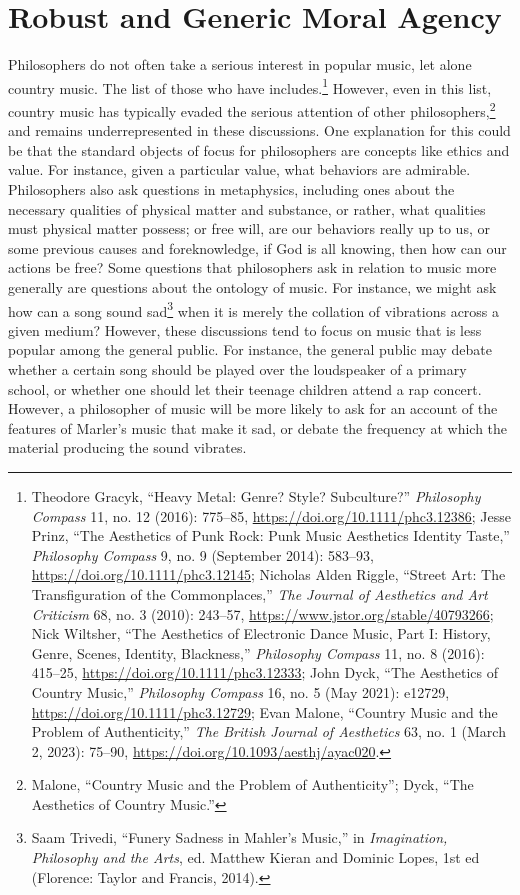 \documentclass[phdthesis,12pt,final,a4paper]{wuthesis}
\theoremstyle{definition}
\theoremstyle{definition}
\theoremstyle{definition}
\theoremstyle{definition}
\theoremstyle{remark}
\begin{document}
\chapter{Robust and Generic Moral Agency}\label{robust-and-generic-moral-agency}

Philosophers do not often take a serious interest in popular music, let alone country music. The list of those who have includes.\footnote{Theodore Gracyk, {``Heavy Metal: Genre? {Style}? {Subculture}?''} \emph{Philosophy Compass} 11, no. 12 (2016): 775--85, \url{https://doi.org/10.1111/phc3.12386}; Jesse Prinz, {``The {Aesthetics} of {Punk Rock}: {Punk Music Aesthetics Identity Taste},''} \emph{Philosophy Compass} 9, no. 9 (September 2014): 583--93, \url{https://doi.org/10.1111/phc3.12145}; Nicholas Alden Riggle, {``Street {Art}: {The Transfiguration} of the {Commonplaces},''} \emph{The Journal of Aesthetics and Art Criticism} 68, no. 3 (2010): 243--57, \url{https://www.jstor.org/stable/40793266}; Nick Wiltsher, {``The {Aesthetics} of {Electronic Dance Music}, {Part I}: {History}, {Genre}, {Scenes}, {Identity}, {Blackness},''} \emph{Philosophy Compass} 11, no. 8 (2016): 415--25, \url{https://doi.org/10.1111/phc3.12333}; John Dyck, {``The Aesthetics of Country Music,''} \emph{Philosophy Compass} 16, no. 5 (May 2021): e12729, \url{https://doi.org/10.1111/phc3.12729}; Evan Malone, {``Country {Music} and the {Problem} of {Authenticity},''} \emph{The British Journal of Aesthetics} 63, no. 1 (March 2, 2023): 75--90, \url{https://doi.org/10.1093/aesthj/ayac020}.} However, even in this list, country music has typically evaded the serious attention of other philosophers,\footnote{Malone, {``Country {Music} and the {Problem} of {Authenticity}''}; Dyck, {``The Aesthetics of Country Music.''}} and remains underrepresented in these discussions. One explanation for this could be that the standard objects of focus for philosophers are concepts like ethics and value. For instance, given a particular value, what behaviors are admirable. Philosophers also ask questions in metaphysics, including ones about the necessary qualities of physical matter and substance, or rather, what qualities must physical matter possess; or free will, are our behaviors really up to us, or some previous causes and foreknowledge, if God is all knowing, then how can our actions be free? Some questions that philosophers ask in relation to music more generally are questions about the ontology of music. For instance, we might ask how can a song sound sad\footnote{Saam Trivedi, {``Funery {Sadness} in {Mahler}'s {Music},''} in \emph{Imagination, {Philosophy} and the {Arts}}, ed. Matthew Kieran and Dominic Lopes, 1st ed (Florence: {Taylor and Francis}, 2014).} when it is merely the collation of vibrations across a given medium? However, these discussions tend to focus on music that is less popular among the general public. For instance, the general public may debate whether a certain song should be played over the loudspeaker of a primary school, or whether one should let their teenage children attend a rap concert. However, a philosopher of music will be more likely to ask for an account of the features of Marler's music that make it sad, or debate the frequency at which the material producing the sound vibrates. 
\end{document}

